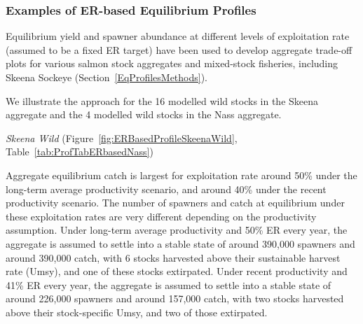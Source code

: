 \documentclass[french,11pt]{book}
\begin{document}
\endgroup{} \endgroup{}

\clearpage

\subsubsection{Examples of ER-based Equilibrium Profiles}\label{examples-of-er-based-equilibrium-profiles}

Equilibrium yield and spawner abundance at different levels of exploitation rate (assumed to be a fixed ER target) have been used to develop aggregate trade-off plots for various salmon stock aggregates and mixed-stock fisheries, including Skeena Sockeye (Section~\ref{EqProfilesMethods}).

We illustrate the approach for the 16 modelled wild stocks in the Skeena aggregate and the 4 modelled wild stocks in the Nass aggregate.

\emph{Skeena Wild} (Figure~\ref{fig:ERBasedProfileSkeenaWild}, Table~\ref{tab:ProfTabERbasedNass})

Aggregate equilibrium catch is largest for exploitation rate around 50\% under the long-term average productivity scenario, and around 40\% under the recent productivity scenario. The number of spawners and catch at equilibrium under these exploitation rates are very different depending on the productivity assumption. Under long-term average productivity and 50\% ER every year, the aggregate is assumed to settle into a stable state of around 390,000 spawners and around 390,000 catch, with 6 stocks harvested above their sustainable harvest rate (Umsy), and one of these stocks extirpated. Under recent productivity and 41\% ER every year, the aggregate is assumed to settle into a stable state of around 226,000 spawners and around 157,000 catch, with two stocks harvested above their stock-specific Umsy, and two of those extirpated.
\end{document}
